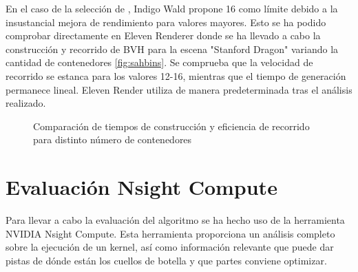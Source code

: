 En el caso de la selección de , Indigo Wald propone 16 como límite \cite{wald2007fast} debido a la insustancial mejora de rendimiento para valores mayores. Esto se ha podido comprobar directamente en Eleven Renderer donde se ha llevado a cabo la construcción y recorrido de BVH para la escena "Stanford Dragon" variando la cantidad de contenedores \autoref{fig:sahbins}. Se comprueba que la velocidad de recorrido se estanca para los valores 12-16, mientras que el tiempo de generación permanece lineal. Eleven Render utiliza de manera predeterminada  tras el análisis realizado.

\begin{figure}[H]
\centering
{}
\caption{Comparación de tiempos de construcción y eficiencia de recorrido para distinto número de contenedores}
\label{fig:sahbins}
\end{figure}


\section{Evaluación Nsight Compute}

Para llevar a cabo la evaluación del algoritmo se ha hecho uso de la herramienta NVIDIA Nsight Compute. Esta herramienta proporciona un análisis completo sobre la ejecución de un kernel, así como información relevante que puede dar pistas de dónde están los cuellos de botella y que partes conviene optimizar.

